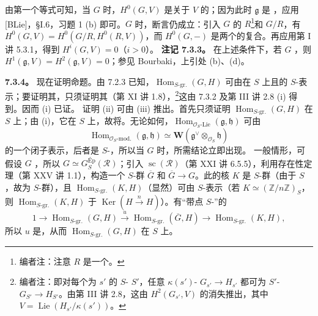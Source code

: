 由第一个等式可知，当 $G$ 时，$H^0(G,V)$ 是关于 $V$ 的；因为此时 $\mathfrak g$ 是 ，应用 [BLie]，\S I.6，习题 1 (b) 即可。$G$ 时，断言仍成立：引入 $G$ 的 $R$\footnote{编者注：注意 $R$ 是一个。}和 $G/R$，有 $H^0(G,V)=H^0(G/R,H^0(R,V))$，而 $H^0(G,-)$ 是两个的复合。再应用第 I 讲 5.3.1，得到 $H^i(G,V)=0$（$i>0$）。
\textbf{注记 7.3.3。} 在上述条件下，若 $G$ ，则 $H^1(\mathfrak g,V)=H^2(\mathfrak g,V)=0$；参见 Bourbaki，上引处 (b)、(d)。

\textbf{7.3.4。} 现在证明命题。由 7.2.3 已知，$\operatorname{Hom}_{S\text{-gr.}}(G,H)$ 可由在 $S$ 上且的 $S$-表示；要证明其，只须证明其（第 XI 讲 1.8），\footnote{编者注：即对每个为 $s'$ 的 $S$- $S'$，任意 $\kappa(s')$- $G_{s'}\to H_{s'}$ 都可为 $S'$- $G_{S'}\to H_{S'}$。由第 III 讲 2.8，这由 $H^2(G_{s'},V)$ 的消失推出，其中 $V=\operatorname{Lie}(H_{s'}/\kappa(s'))$。}这由 7.3.2 及第 III 讲 2.8 (i) 得到。因而 (i) 已证。
证明 (ii) 可由 (iii) 推出。首先只须证明 $\operatorname{Hom}_{S\text{-gr.}}(G,H)$ 在 $S$ 上；由 (i)，它在 $S$ 上，故将。无论如何，$\operatorname{Hom}_{\mathscr O_S\text{-Lie}}(\mathfrak g,\mathfrak h)$ 可由
\[\operatorname{Hom}_{\mathscr O_S\text{-mod.}}(\mathfrak g,\mathfrak h)\simeq\mathbf W(\mathfrak g^\vee\otimes_{\mathscr O_S}\mathfrak h)\]
的一个闭子表示，后者是 $S$-，所以当 $G$ 时，所需结论立即出现。
一般情形，可假设 $G$ ，所以 $G\simeq G_S^{\mathrm{Ép}}(\mathscr R)$；引入 $\operatorname{sc}(\mathscr R)$（第 XXI 讲 6.5.5），利用存在性定理（第 XXV 讲 1.1），构造一个 $S$-群 $\overline G$ 和 $\overline G\to G$。此的核 $K$ 是 $S$-群（由于 $S$ ，故为 $S$-群），且 $\operatorname{Hom}_{S\text{-gr.}}(K,H)$（显然）可由 $S$-表示（若 $K\simeq(\mathbb Z/n\mathbb Z)_S$，则 $\operatorname{Hom}_{S\text{-gr.}}(K,H)$ 于 $\operatorname{Ker}(H\xrightarrow{n}H)$）。有“带点 $S$-”的
\[1\longrightarrow\operatorname{Hom}_{S\text{-gr.}}(G,H)\xrightarrow{u}\operatorname{Hom}_{S\text{-gr.}}(\overline G,H)\longrightarrow\operatorname{Hom}_{S\text{-gr.}}(K,H),\]
所以 $u$ 是，从而 $\operatorname{Hom}_{S\text{-gr.}}(G,H)$ 在 $S$ 上。

